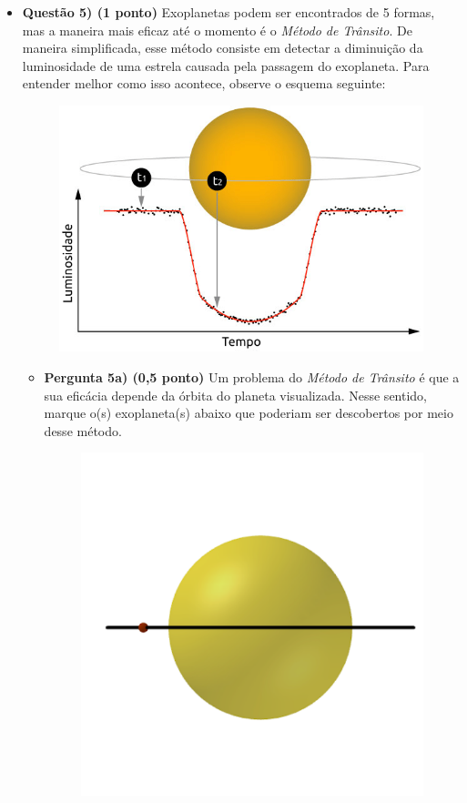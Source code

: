 \documentclass[a4paper, 12pt]{article}
\begin{document}
\begin{flushleft}
\begin{itemize}
		\item \textbf{Questão 5) (1 ponto)} Exoplanetas podem ser encontrados de 5 formas, mas a maneira mais eficaz até o momento é o \textit{Método de Trânsito}. De maneira simplificada, esse método consiste em detectar a diminuição da luminosidade de uma estrela causada pela passagem do exoplaneta. Para entender melhor como isso acontece, observe o esquema seguinte:
			\begin{figure}[H]
				\centering
				\includegraphics[scale=0.7]{./img/5a.png}
			\end{figure}
			\begin{itemize}
				\item \textbf{Pergunta 5a) (0,5 ponto)} Um problema do \textit{Método de Trânsito} é que a sua eficácia depende da órbita do planeta visualizada. Nesse sentido, marque o(s) exoplaneta(s) abaixo que poderiam ser descobertos por meio desse método.
					\begin{multicols}{3}
						\begin{figure}[H]
							\centering
							\includegraphics[scale=0.2]{./img/5b1.png}

\end{figure}
\end{multicols}
\end{itemize}
\end{itemize}
\end{flushleft}
\end{document}
